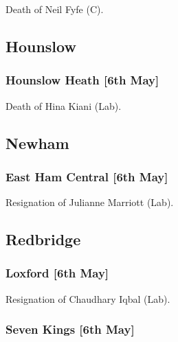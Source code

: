 \documentclass[a4paper,openany]{book}
\begin{document}
\begin{resultsiii}

Death of Neil Fyfe (C).

\subsection*{Hounslow}

\subsubsection*{Hounslow Heath \hspace*{\fill}\nolinebreak[1]%
	\enspace\hspace*{\fill}
	[6th May]}


Death of Hina Kiani (Lab).

\subsection*{Newham}

\subsubsection*{East Ham Central \hspace*{\fill}\nolinebreak[1]%
	\enspace\hspace*{\fill}
	[6th May]}


Resignation of Julianne Marriott (Lab).

\subsection*{Redbridge}

\subsubsection*{Loxford \hspace*{\fill}\nolinebreak[1]%
	\enspace\hspace*{\fill}
	[6th May]}


Resignation of Chaudhary Iqbal (Lab).

\subsubsection*{Seven Kings \hspace*{\fill}\nolinebreak[1]%
	\enspace\hspace*{\fill}
	[6th May]}


\end{resultsiii}
\end{document}
